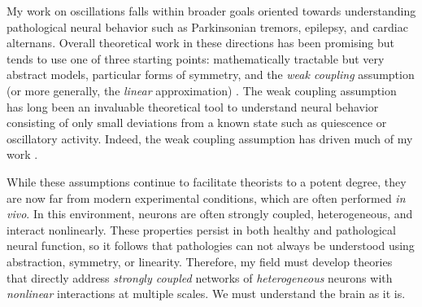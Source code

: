 \documentclass[a4paper,11pt]{article}
\begin{document}
	
	
	My work on oscillations falls within broader goals oriented towards understanding pathological neural behavior such as Parkinsonian tremors, epilepsy, and cardiac alternans. Overall theoretical work in these directions has been promising but tends to use one of three starting points: mathematically tractable but very abstract models, particular forms of symmetry, and the \textit{weak coupling} assumption (or more generally, the \textit{linear} approximation) \cite{ermentrout2002modeling}. The weak coupling assumption has long been an invaluable theoretical tool to understand neural behavior consisting of only small deviations from a known state such as quiescence or oscillatory activity. Indeed, the weak coupling assumption has driven much of my work \cite{park2016weakly,park2018multiple,park2018scalar}. 
	
	While these assumptions continue to facilitate theorists to a potent degree, they are now far from modern experimental conditions, which are often performed \textit{in vivo}. In this environment, neurons are often strongly coupled, heterogeneous, and interact nonlinearly. These properties persist in both healthy and pathological neural function, so it follows that pathologies can not always be understood using abstraction, symmetry, or linearity. Therefore, my field must develop theories that directly address \textit{strongly coupled} networks of \textit{heterogeneous} neurons with \textit{nonlinear} interactions at multiple scales. We must understand the brain as it is.
	
\end{document}
